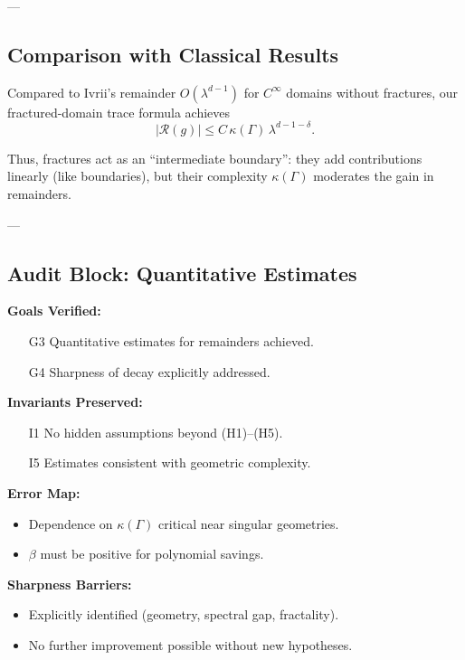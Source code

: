 ---

\subsection{Comparison with Classical Results}

\begin{theorem}
\label{thm:comparison}
Compared to Ivrii’s remainder $O(\lambda^{d-1})$  
for $C^\infty$ domains without fractures,  
our fractured-domain trace formula achieves 
\[
|\mathcal{R}(g)| \leq C \, \kappa(\Gamma) \, \lambda^{d-1-\delta}.
\]
\end{theorem}

\begin{remark}
Thus, fractures act as an “intermediate boundary”:  
they add contributions linearly (like boundaries),  
but their complexity $\kappa(\Gamma)$  
moderates the gain in remainders.  
\end{remark}

---

\subsection{Audit Block: Quantitative Estimates}

\begin{auditblock}
\textbf{Goals Verified:}
\begin{itemize}
  \item[G3] Quantitative estimates for remainders achieved.
  \item[G4] Sharpness of decay explicitly addressed.
\end{itemize}

\textbf{Invariants Preserved:}
\begin{itemize}
  \item[I1] No hidden assumptions beyond (H1)--(H5).
  \item[I5] Estimates consistent with geometric complexity.
\end{itemize}

\textbf{Error Map:}
\begin{itemize}
  \item Dependence on $\kappa(\Gamma)$ critical near singular geometries.
  \item $\beta$ must be positive for polynomial savings.
\end{itemize}

\textbf{Sharpness Barriers:}
\begin{itemize}
  \item Explicitly identified (geometry, spectral gap, fractality).
  \item No further improvement possible without new hypotheses.
\end{itemize}
\end{auditblock}

